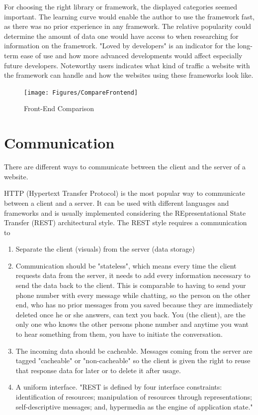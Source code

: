 For choosing the right library or framework, the displayed categories seemed important.
The learning curve would enable the author to use the framework fast, as there was no prior experience in any framework.
The relative popularity could determine the amount of data one would have access to when researching for information on the framework.
"Loved by developers" is an indicator for the long-term ease of use and how more advanced developments would affect especially future developers.
Noteworthy users indicates what kind of traffic a website with the framework can handle and how the websites using these frameworks look like.

\begin{figure}[b]
	\centering
    \texttt{[image: Figures/CompareFrontend]}
	\decoRule
	\caption[Front End Comparison]{Front-End Comparison}
	\label{fig:frontEndCompare}
\end{figure}

\section{Communication}
There are different ways to communicate between the client and the server of a website. 

HTTP (Hypertext Transfer Protocol) is the most popular way to communicate between a client and a server.
It can be used with different languages and frameworks and is usually implemented considering the REpresentational State Transfer (REST) architectural style.
The REST style requires a communication to 
\begin{enumerate}
    \item Separate the client (visuals) from the server (data storage)
    \item 
    Communication should be "stateless", which means every time the client requests data from the server, 
    it needs to add every information necessary to send the data back to the client. 
    This is comparable to having to send your phone number with every message while chatting,
    so the person on the other end, who has no prior messages from you saved because they are immediately deleted once he or she answers, can text you back.
    You (the client), are the only one who knows the other persons phone number and anytime you want to hear something from them, you have to initiate the conversation.
    \item The incoming data should be cacheable. 
    Messages coming from the server are tagged "cacheable" or "non-cacheable" so the client is given the right to 
    reuse that response data for later or to delete it after usage.
    \item A uniform interface. 
    "REST is defined by four interface constraints: identification of resources; manipulation of resources through representations; self-descriptive messages; and, hypermedia as the engine of application state."
    \parencite{restful}
\end{enumerate}

